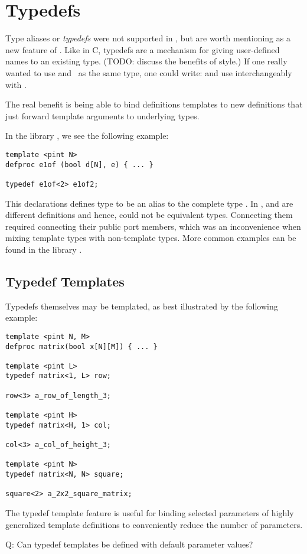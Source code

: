 
\section{Typedefs}
\label{sec:typedefs}

Type aliases or \emph{typedefs} were not supported in \CAST, 
but are worth mentioning as a new feature of \hac.  
Like in C, typedefs are a mechanism for giving user-defined names
to an existing type.  
(TODO: discuss the benefits of style.)
If one really wanted to use  and \bool\ as the same type, 
one could write: 
and use  interchangeably with \bool.  

The real benefit is being able to bind definitions templates
to new definitions that just forward template arguments to
underlying types.  

In the library , we see the following example:

\begin{verbatim}
template <pint N>
defproc e1of (bool d[N], e) { ... }

typedef	e1of<2> e1of2;
\end{verbatim}

This declarations defines type  to be an alias
to the complete type .  
In \CAST,  and  are different definitions and hence,
could not be equivalent types.  
Connecting them required connecting their public port members, 
which was an inconvenience when mixing template types with non-template types.  
More common examples can be found in the library .  

\subsection{Typedef Templates}
\label{sec:typedefs:templates}

Typedefs themselves may be templated, as best illustrated by 
the following example:

\begin{verbatim}
template <pint N, M>
defproc matrix(bool x[N][M]) { ... }

template <pint L>
typedef matrix<1, L> row;

row<3> a_row_of_length_3;

template <pint H>
typedef matrix<H, 1> col;

col<3> a_col_of_height_3;

template <pint N>
typedef matrix<N, N> square;

square<2> a_2x2_square_matrix;
\end{verbatim}

The typedef template feature is useful for binding selected parameters
of highly generalized template definitions to conveniently
reduce the number of parameters.  

Q: Can typedef templates be defined with default parameter values?

